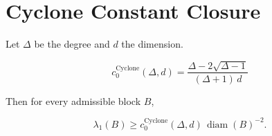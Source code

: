 \documentclass{article}
\begin{document}
\section*{Cyclone Constant Closure}

Let $\Delta$ be the degree and $d$ the dimension.

\[
c_0^{\mathrm{Cyclone}}(\Delta,d)=
\frac{\Delta-2\sqrt{\Delta-1}}{(\Delta+1)\,d}
\]

Then for every admissible block $B$,

\[
\lambda_1(B)\ge
c_0^{\mathrm{Cyclone}}(\Delta,d)\,\operatorname{diam}(B)^{-2}.
\]
\end{document}
